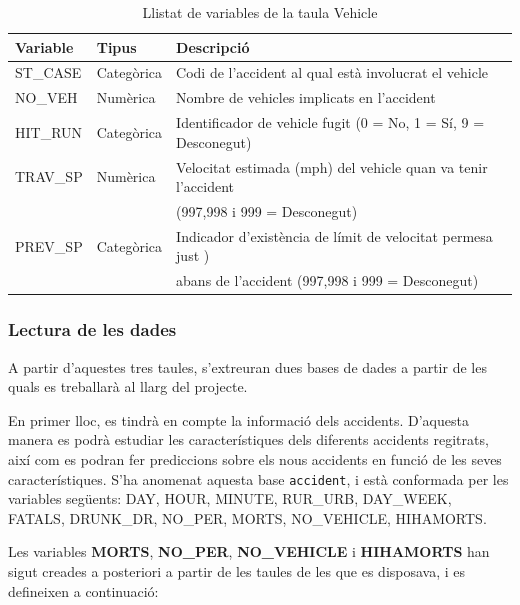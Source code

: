 \documentclass[12pt,longbibliography]{article}
\theoremstyle{definition}
\theoremstyle{remark}
\begin{document}
\begin{table}[H]
\centering
\begin{tabular}{|l|l|l|}
\hline
\textbf{Variable} & \textbf{Tipus} & \textbf{Descripció}                                             \\\hline
ST\_CASE           & Categòrica     & Codi de l’accident al qual està involucrat el vehicle           \\
NO\_VEH            & Numèrica       & Nombre de vehicles implicats en l'accident                      \\
HIT\_RUN           & Categòrica     & Identificador de vehicle fugit (0 = No, 1 = Sí, 9 = Desconegut) \\
TRAV\_SP & Numèrica   & Velocitat estimada (mph) del vehicle quan va tenir l’accident                \\
                &                    & (997,998 i 999 = Desconegut)                 \\
PREV\_SP & Categòrica & Indicador d’existència de límit de velocitat permesa just ) \\
                &                    & abans de l’accident (997,998 i 999 = Desconegut) \\ \hline
\end{tabular}
\caption{\label{vehicle-table}Llistat de variables de la taula Vehicle}
\end{table}

\subsubsection{Lectura de les dades}

A partir d'aquestes tres taules, s'extreuran dues bases de dades a partir de les quals es treballarà al llarg del projecte.


En primer lloc, es tindrà en compte la informació dels accidents. D'aquesta manera es podrà estudiar les característiques dels diferents accidents regitrats, així com es podran fer prediccions sobre els nous accidents en funció de les seves característiques. S'ha anomenat aquesta base \texttt{accident}, i està conformada per les variables següents: DAY, HOUR, MINUTE, RUR\_URB, DAY\_WEEK, FATALS, DRUNK\_DR, NO\_PER, MORTS, NO\_VEHICLE, HIHAMORTS.


Les variables \textbf{MORTS}, \textbf{NO\_PER}, \textbf{NO\_VEHICLE} i \textbf{HIHAMORTS} han sigut creades a posteriori a partir de les taules de les que es disposava, i es defineixen a continuació:
\end{document}
